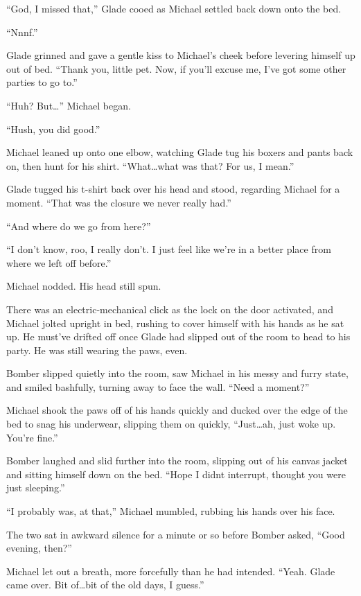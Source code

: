 ``God, I missed that,'' Glade cooed as Michael settled back down onto the bed.

``Nnnf.''

Glade grinned and gave a gentle kiss to Michael's cheek before levering himself up out of bed.  ``Thank you, little pet.  Now, if you'll excuse me, I've got some other parties to go to.''

``Huh?  But\ldots{}'' Michael began.

``Hush, you did good.''

Michael leaned up onto one elbow, watching Glade tug his boxers and pants back on, then hunt for his shirt.  ``What\ldots{}what was that?  For us, I mean.''

Glade tugged his t-shirt back over his head and stood, regarding Michael for a moment.  ``That was the closure we never really had.''

``And where do we go from here?''

``I don't know, roo, I really don't.  I just feel like we're in a better place from where we left off before.''

Michael nodded.  His head still spun.

\secdiv

There was an electric-mechanical click as the lock on the door activated, and Michael jolted upright in bed, rushing to cover himself with his hands as he sat up.  He must've drifted off once Glade had slipped out of the room to head to his party.  He was still wearing the paws, even.

Bomber slipped quietly into the room, saw Michael in his messy and furry state, and smiled bashfully, turning away to face the wall.  ``Need a moment?''

Michael shook the paws off of his hands quickly and ducked over the edge of the bed to snag his underwear, slipping them on quickly, ``Just\ldots{}ah, just woke up.  You're fine.''

Bomber laughed and slid further into the room, slipping out of his canvas jacket and sitting himself down on the bed.  ``Hope I didnt interrupt, thought you were just sleeping.''

``I probably was, at that,'' Michael mumbled, rubbing his hands over his face.

The two sat in awkward silence for a minute or so before Bomber asked, ``Good evening, then?''

Michael let out a breath, more forcefully than he had intended.  ``Yeah.  Glade came over.  Bit of\ldots{}bit of the old days, I guess.''

